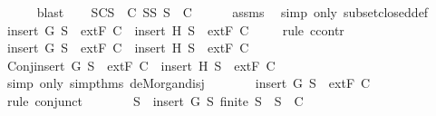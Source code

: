 \begin{isabellebody}
\ \ \ \ \isamarkupfalse%
\ blast\isanewline
\ \ \isamarkupfalse%
\ SC{\isacharcolon}{\isachardoublequoteopen}{\isasymforall}S\ {\isasymin}\ C{\isachardot}\ {\isasymforall}S{\isacharprime}{\isasymsubseteq}S{\isachardot}\ S{\isacharprime}\ {\isasymin}\ C{\isachardoublequoteclose}\isanewline
\ \ \ \ \isamarkupfalse%
\ assms{\isacharparenleft}{}{\isacharparenright}\ \isamarkupfalse%
\ {\isacharparenleft}simp\ only{\isacharcolon}\ subset{\isacharunderscore}closed{\isacharunderscore}def{\isacharparenright}\isanewline
\ \ \isamarkupfalse%
\ {\isachardoublequoteopen}insert\ G\ S\ {\isasymin}\ {\isacharparenleft}extF\ C{\isacharparenright}\ {\isasymor}\ insert\ H\ S\ {\isasymin}\ {\isacharparenleft}extF\ C{\isacharparenright}{\isachardoublequoteclose}\ \isanewline
\ \ \isamarkupfalse%
\ {\isacharparenleft}rule\ ccontr{\isacharparenright}\isanewline
\ \ \ \ \isamarkupfalse%
\ {\isachardoublequoteopen}{\isasymnot}{\isacharparenleft}insert\ G\ S\ {\isasymin}\ {\isacharparenleft}extF\ C{\isacharparenright}\ {\isasymor}\ insert\ H\ S\ {\isasymin}\ {\isacharparenleft}extF\ C{\isacharparenright}{\isacharparenright}{\isachardoublequoteclose}\ \ \isanewline
\ \ \ \ \isamarkupfalse%
\ \isamarkupfalse%
\ Conj{\isacharcolon}{\isachardoublequoteopen}{\isasymnot}{\isacharparenleft}insert\ G\ S\ {\isasymin}\ {\isacharparenleft}extF\ C{\isacharparenright}{\isacharparenright}\ {\isasymand}\ {\isasymnot}{\isacharparenleft}insert\ H\ S\ {\isasymin}\ {\isacharparenleft}extF\ C{\isacharparenright}{\isacharparenright}{\isachardoublequoteclose}\ \isanewline
\ \ \ \ \ \ \isamarkupfalse%
\ {\isacharparenleft}simp\ only{\isacharcolon}\ simp{\isacharunderscore}thms{\isacharparenleft}{}{\isacharcomma}{}{}{\isacharparenright}\ de{\isacharunderscore}Morgan{\isacharunderscore}disj{\isacharparenright}\isanewline
\ \ \ \ \isamarkupfalse%
\ \isamarkupfalse%
\ {\isachardoublequoteopen}{\isasymnot}{\isacharparenleft}insert\ G\ S\ {\isasymin}\ {\isacharparenleft}extF\ C{\isacharparenright}{\isacharparenright}{\isachardoublequoteclose}\isanewline
\ \ \ \ \ \ \isamarkupfalse%
\ {\isacharparenleft}rule\ conjunct{}{\isacharparenright}\isanewline
\ \ \ \ \isamarkupfalse%
\ \isamarkupfalse%
\ {\isachardoublequoteopen}{\isasymnot}{\isacharparenleft}{\isasymforall}S{\isacharprime}\ {\isasymsubseteq}\ {\isacharparenleft}insert\ G\ S{\isacharparenright}{\isachardot}\ finite\ S{\isacharprime}\ {\isasymlongrightarrow}\ S{\isacharprime}\ {\isasymin}\ C{\isacharparenright}{\isachardoublequoteclose}\isanewline

\end{isabellebody}
